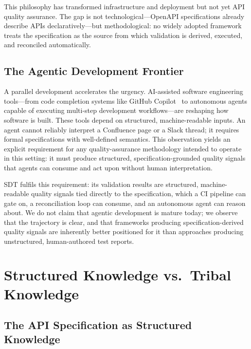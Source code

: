This philosophy has transformed infrastructure and deployment but not yet API quality assurance. The gap is not technological---OpenAPI specifications already describe APIs declaratively---but methodological: no widely adopted framework treats the specification as the source from which validation is derived, executed, and reconciled automatically.

\subsection{The Agentic Development Frontier}
\label{subsec:agentic-dev}

A parallel development accelerates the urgency. AI-assisted software engineering tools---from code completion systems like GitHub Copilot~\cite{github-copilot-research} to autonomous agents capable of executing multi-step development workflows---are reshaping how software is built. These tools depend on structured, machine-readable inputs. An agent cannot reliably interpret a Confluence page or a Slack thread; it requires formal specifications with well-defined semantics. This observation yields an explicit requirement for any quality-assurance methodology intended to operate in this setting: it must produce structured, specification-grounded quality signals that agents can consume and act upon without human interpretation.

SDT fulfils this requirement: its validation results are structured, machine-readable quality signals tied directly to the specification, which a CI pipeline can gate on, a reconciliation loop can consume, and an autonomous agent can reason about. We do not claim that agentic development is mature today; we observe that the trajectory is clear, and that frameworks producing specification-derived quality signals are inherently better positioned for it than approaches producing unstructured, human-authored test reports.

\section{Structured Knowledge vs.\ Tribal Knowledge}
\label{sec:structured-vs-tribal}

\subsection{The API Specification as Structured Knowledge}
\label{subsec:spec-as-knowledge}

